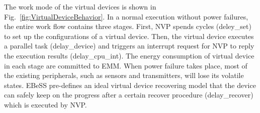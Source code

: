 The work mode of the virtual devices is shown in Fig.~\ref{fig:VirtualDeviceBehavior}.
In a normal execution without power failures, the entire work flow contains three stages.
First, NVP spends cycles (deley\_set) to set up the configurations of a virtual device.
Then, the virtual device executes a parallel task (delay\_device) and triggers an interrupt request for NVP to reply the execution results (delay\_cpu\_int).
The energy consumption of virtual device in each stage are committed to EMM.
When power failure takes place, most of the existing peripherals, such as sensors and transmitters, will lose its volatile states.
EBeSS pre-defines an ideal virtual device recovering model that the device can safely keep on the progress after a certain recover procedure (delay\_recover) which is executed by NVP.
